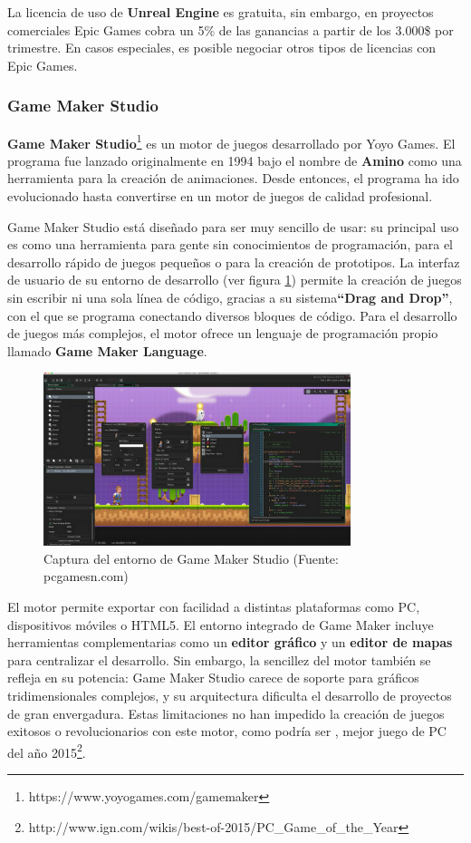 La licencia de uso de \textbf{Unreal Engine} es gratuita, sin embargo, en proyectos comerciales Epic Games cobra un 5\% de las ganancias a partir de los 3.000\$ por trimestre. En casos especiales, es posible negociar otros tipos de licencias con Epic Games.

\subsubsection{Game Maker Studio}
\textbf{Game Maker Studio}\footnote{https://www.yoyogames.com/gamemaker} es un motor de juegos desarrollado por Yoyo Games. El programa fue lanzado originalmente en 1994 bajo el nombre de \textbf{Amino} como una herramienta para la creación de animaciones. Desde entonces, el programa ha ido evolucionado hasta convertirse en un motor de juegos de calidad profesional.

Game Maker Studio está diseñado para ser muy sencillo de usar: su principal uso es como una herramienta para gente sin conocimientos de programación, para el desarrollo rápido de juegos pequeños o para la creación de prototipos. La interfaz de usuario de su entorno de desarrollo (ver figura \ref{captura-game-maker}) permite la creación de juegos sin escribir ni una sola línea de código, gracias a su sistema\textbf{``Drag and Drop''}, con el que se programa conectando diversos bloques de código. Para el desarrollo de juegos más complejos, el motor ofrece un lenguaje de programación propio llamado \textbf{Game Maker Language}. 

\begin{figure}[h]
	\includegraphics[width=0.8\textwidth]{images/estadodelarte/motores/captura-game-maker}
	\centering
	\caption{Captura del entorno de Game Maker Studio (Fuente: pcgamesn.com)}
	\label{captura-game-maker}
\end{figure}

El motor permite exportar con facilidad a distintas plataformas como PC, dispositivos móviles o HTML5. El entorno integrado de Game Maker incluye herramientas complementarias como un \textbf{editor gráfico} y un \textbf{editor de mapas} para centralizar el desarrollo. Sin embargo, la sencillez del motor también se refleja en su potencia: Game Maker Studio carece de soporte para gráficos tridimensionales complejos, y su arquitectura dificulta el desarrollo de proyectos de gran envergadura. Estas limitaciones no han impedido la creación de juegos exitosos o revolucionarios con este motor, como podría ser , mejor juego de PC del año 2015\footnote{http://www.ign.com/wikis/best-of-2015/PC\_Game\_of\_the\_Year}.

